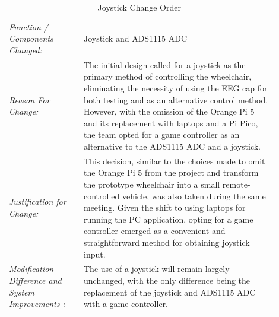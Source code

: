 \documentclass[conference]{IEEEtran}
\begin{document}
    \begin{table}[!ht]%
        \centering
            \begin{tabular}{|>{\columncolor{black!5}}p{0.25\linewidth}|>{}p{0.65\linewidth}|}
            
            \hline
            \rowcolor{black!20} 
             \multicolumn{2}{|c|}{\textbf{Change Order Form}} %
            \\ \hline

            \textit{Function / Components Changed: } & Joystick and ADS1115 ADC  
            
            \\ \hline

            \textit{Reason For Change:} & The initial design called for a joystick as the primary method of controlling the wheelchair, eliminating the necessity of using the EEG cap for both testing and as an alternative control method. However, with the omission of the Orange Pi 5 and its replacement with laptops and a Pi Pico, the team opted for a game controller as an alternative to the ADS1115 ADC and a joystick. 

            \\ \hline

            \textit{Justification for Change:} & This decision, similar to the choices made to omit the Orange Pi 5 from the project and transform the prototype wheelchair into a small remote-controlled vehicle, was also taken during the same meeting. Given the shift to using laptops for running the PC application, opting for a game controller emerged as a convenient and straightforward method for obtaining joystick input. 

            \\ \hline

            \textit{Modification Difference and System Improvements :} & The use of a joystick will remain largely unchanged, with the only difference being the replacement of the joystick and ADS1115 ADC with a game controller. 
            \\ \hline

           \end{tabular}           
        \caption{Joystick Change Order}
        \label{tab:joystick_change_order}
    \end{table}
\end{document}

